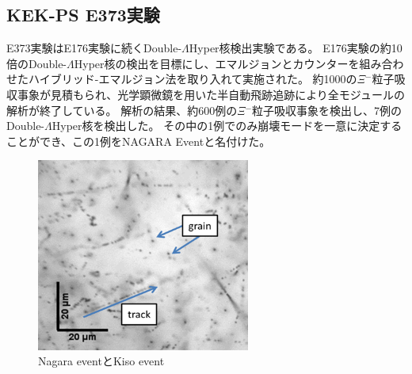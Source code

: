 \documentclass[12pt,a4paper]{jarticle}
\begin{document}
\subsection{KEK-PS E373実験}
E373実験はE176実験に続くDouble-$\Lambda$Hyper核検出実験である。
\cite{Nagara}
\cite{Nagara2}
E176実験の約10倍のDouble-$\Lambda$Hyper核の検出を目標にし、エマルジョンとカウンターを組み合わせたハイブリッド-エマルジョン法を取り入れて実施された。
約1000の$\Xi$$^-$粒子吸収事象が見積もられ、光学顕微鏡を用いた半自動飛跡追跡により全モジュールの解析が終了している。
解析の結果、約600例の$\Xi$$^-$粒子吸収事象を検出し、7例のDouble-$\Lambda$Hyper核を検出した。
その中の1例でのみ崩壊モードを一意に決定することができ、この1例をNAGARA Eventと名付けた。
\begin{figure}[htbp]
    \begin{center}
     \includegraphics[width=70mm]{grainfog.png}
    \end{center}
    \caption{Nagara eventとKiso event\label{fig:Nagara_Kiso}}
\end{figure}
\end{document}
